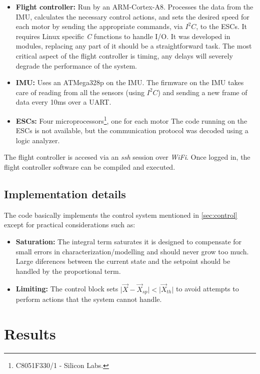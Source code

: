 \documentclass[conference]{IEEEtran}
\begin{document}
\begin{itemize}
\item \textbf{Flight controller:} Run by an ARM-Cortex-A8. Processes the data from the IMU, calculates the necessary control actions, and sets the desired speed for each motor by sending the appropriate commands, via $I^2C$, to the ESCs. It requires Linux specific \textit{C} functions to handle I/O. It was developed in modules, replacing any part of it should be a straightforward task. The most critical aspect of the flight controller is timing, any delays will severely degrade the performance of the system.
\item \textbf{IMU:} Uses an ATMega328p on the IMU. The firmware on the IMU takes care of reading from all the sensors (using $I^2C$) and sending a new frame of data every 10ms over a UART.
\item \textbf{ESCs:} Four microprocessors\footnote{C8051F330/1 - Silicon Labs.}, one for each motor The code running on the ESCs is not available, but the communication protocol was decoded using a logic analyzer.
\end{itemize}

The flight controller is accesed via an \textit{ssh} session over \textit{WiFi}. Once logged in, the flight controller software can be compiled and executed.

\subsection{Implementation details}
\label{sec:software-impl}

The code basically implements the control system mentioned in \ref{sec:control} except for practical considerations such as:
\begin{itemize}
\item \textbf{Saturation:} The integral term saturates it is designed to compensate for small errors in characterization/modelling and should never grow too much. Large diferences between the current state and the setpoint should be handled by the proportional term.
\item \textbf{Limiting:} The control block sets $\vert \vec{X} - \vec{X}_{sp}\vert < \vert \vec{X}_{th} \vert$ to avoid attempts to perform actions that the system cannot handle.
\end{itemize}


\section{Results}
\end{document}

